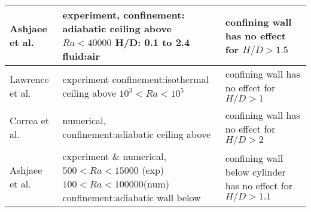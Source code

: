 \begin{table}[h]
\begin{center}
\begin{tabular}{|p{3cm}|p{5cm}|p{6cm}|}
\hline
Ashjaee et al. & \pbox{5cm}{experiment,\\confinement: adiabatic ceiling above\\$Ra<40000$\\H/D: 0.1 to 2.4\\fluid:air} &confining wall has no effect for $H/D>1.5$ \\
\hline
Lawrence et al. & \pbox{5cm}{experiment\\confinement:isothermal ceiling above\\$10^3<Ra<10^5$}& confining wall has no effect for $H/D>1$ \\
\hline
Correa et al. & \pbox{5cm}{numerical, \\confinement:adiabatic ceiling above} & confining wall has no effect for $H/D>2$\\
\hline  
\hline
Ashjaee et al. & \pbox{5cm}{experiment \& numerical, \\$500<Ra<15000$ (exp)\\$100<Ra<100000$(num)\\confinement:adiabatic wall below} & confining wall below cylinder has no effect for $H/D>1.1$\\
\hline                
\end{tabular}
\end{center}
\end{table}

